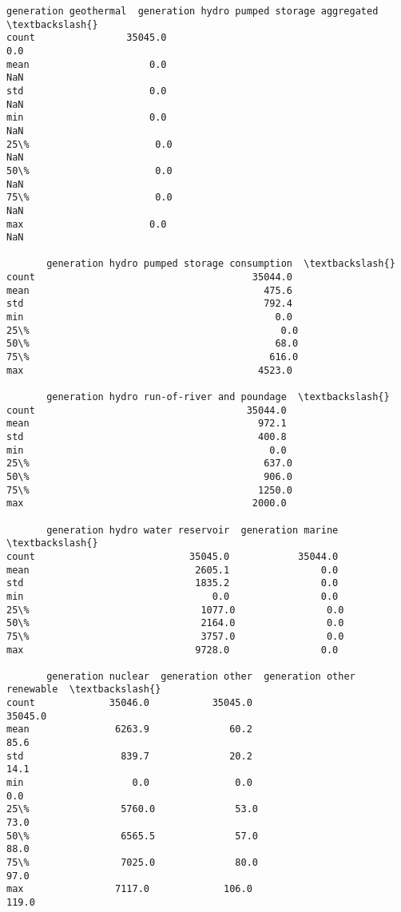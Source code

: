 \documentclass[11pt]{article}
\begin{document}
\begin{tcolorbox}[breakable, size=fbox, boxrule=.5pt, pad at break*=1mm, opacityfill=0]
\begin{Verbatim}[commandchars=\\\{\}]
       generation geothermal  generation hydro pumped storage aggregated  \textbackslash{}
count                35045.0                                         0.0
mean                     0.0                                         NaN
std                      0.0                                         NaN
min                      0.0                                         NaN
25\%                      0.0                                         NaN
50\%                      0.0                                         NaN
75\%                      0.0                                         NaN
max                      0.0                                         NaN

       generation hydro pumped storage consumption  \textbackslash{}
count                                      35044.0
mean                                         475.6
std                                          792.4
min                                            0.0
25\%                                            0.0
50\%                                           68.0
75\%                                          616.0
max                                         4523.0

       generation hydro run-of-river and poundage  \textbackslash{}
count                                     35044.0
mean                                        972.1
std                                         400.8
min                                           0.0
25\%                                         637.0
50\%                                         906.0
75\%                                        1250.0
max                                        2000.0

       generation hydro water reservoir  generation marine  \textbackslash{}
count                           35045.0            35044.0
mean                             2605.1                0.0
std                              1835.2                0.0
min                                 0.0                0.0
25\%                              1077.0                0.0
50\%                              2164.0                0.0
75\%                              3757.0                0.0
max                              9728.0                0.0

       generation nuclear  generation other  generation other renewable  \textbackslash{}
count             35046.0           35045.0                     35045.0
mean               6263.9              60.2                        85.6
std                 839.7              20.2                        14.1
min                   0.0               0.0                         0.0
25\%                5760.0              53.0                        73.0
50\%                6565.5              57.0                        88.0
75\%                7025.0              80.0                        97.0
max                7117.0             106.0                       119.0


\end{Verbatim}
\end{tcolorbox}
\end{document}
